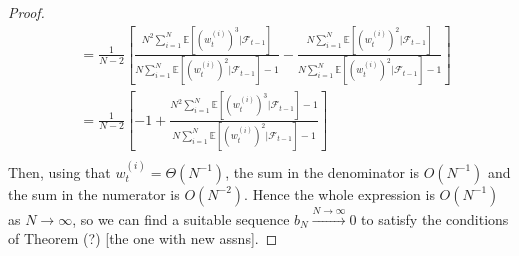 \documentclass[fleqn]{article}
\theoremstyle{definition}
\newcommand{\E}{\mathbb{E}}
\newcommand{\Ntoinfty}{\overset{N\to\infty}{\longrightarrow}}
\newcommand{\F}{\mathcal{F}_{t-1}}
\newcommand{\wt}[2][t]{w_{#1}^{(#2)}}
\begin{document}
\begin{proof}
\begin{align*}
&= \frac{1}{N-2} \left[ \frac{N^2 \sum_{i=1}^N \E[(\wt{i})^3 |\F]}{ N \sum_{i=1}^N \E[(\wt{i})^2 |\F] - 1} - \frac{N \sum_{i=1}^N \E[(\wt{i})^2 |\F]}{ N \sum_{i=1}^N \E[(\wt{i})^2 |\F] - 1} \right] \\
&= \frac{1}{N-2} \left[-1 + \frac{N^2 \sum_{i=1}^N \E[(\wt{i})^3 |\F] -1}{ N \sum_{i=1}^N \E[(\wt{i})^2 |\F] - 1} \right] \\
\end{align*}
Then, using that $\wt{i} =\Theta (N^{-1})$, the sum in the denominator is $O(N^{-1})$ and the sum in the numerator is $O(N^{-2})$. Hence the whole expression is $O(N^{-1})$ as $N\to\infty$, so we can find a suitable sequence $b_N \Ntoinfty 0$ to satisfy the conditions of Theorem (?) [the one with new assns].
\end{proof}


\end{document}
